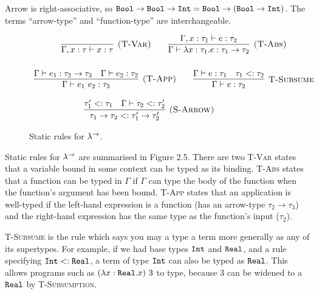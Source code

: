 Arrow is right-associative, so $\mathtt{Bool} \rightarrow \mathtt{Bool} \rightarrow \mathtt{Int} = \mathtt{Bool} \rightarrow (\mathtt{Bool} \rightarrow \mathtt{Int})$. The terms ``arrow-type'' and ``function-type'' are interchangeable. \\

\begin{figure}[h]


\[
\begin{array}{c}


\infer[\textsc{(T-Var)}]
	{\Gamma, x: \tau \vdash x: \tau}
	{}
	
~~~~~~
	
\infer[\textsc{(T-Abs)}]
	{\Gamma \vdash \lambda x: \tau_1.e : \tau_1 \rightarrow \tau_2}
	{\Gamma, x: \tau_1 \vdash e: \tau_2} \\[4ex]
	
	
\infer[\textsc{(T-App)}]
	{\Gamma \vdash e_1~e_2: \tau_3}
	{\Gamma \vdash e_1: \tau_2 \rightarrow \tau_3 & \Gamma \vdash e_2: \tau_2}
	~~~~~~
\infer[\textsc{T-Subsume}]
	{\Gamma \vdash e: \tau_2}
	{\Gamma \vdash e: \tau_1 & \tau_1 <: \tau_2 }

\end{array}
\]

	
\fbox{$\tau <: \tau$}

	
\[
\begin{array}{c}


\infer[\textsc{(S-Arrow)}]
	{\tau_1 \rightarrow \tau_2 <: \tau_1' \rightarrow \tau_2'}
	{\tau_1' <: \tau_1 & \Gamma \vdash \tau_2 <: \tau_2'}

~~~~~~

\end{array}
\]

\vspace{-7pt}
\caption{Static rules for $\lambda^{\rightarrow}$.}
\label{This is the label.}
\end{figure}

Static rules for $\lambda^{\rightarrow}$ are summarised in Figure 2.5. There are two \textsc{T-Var} states that a variable bound in some context can be typed as its binding. \textsc{T-Abs} states that a function can be typed in $\Gamma$ if $\Gamma$ can type the body of the function when the function's argument has been bound. \textsc{T-App} states that an application is well-typed if the left-hand expression is a function (has an arrow-type $\tau_2 \rightarrow \tau_3$) and the right-hand expression has the same type as the function's input ($\tau_2$).

\textsc{T-Subsume} is the rule which says you may a type a term more generally as any of its supertypes. For example, if we had base types $\mathtt{Int}$ and $\mathtt{Real}$, and a rule specifying $\mathtt{Int} <: \mathtt{Real}$, a term of type $\mathtt{Int}$ can also be typed as $\mathtt{Real}$. This allows programs such as $(\lambda x: \mathtt{Real}. x)~3$ to type, because $3$ can be widened to a $\mathtt{Real}$ by \textsc{T-Subsumption}.

